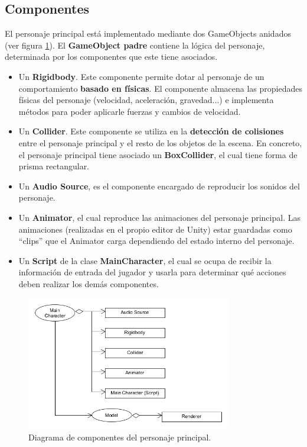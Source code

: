 \subsection{Componentes}
El personaje principal está implementado mediante dos GameObjects anidados (ver figura \ref{diagrama_personaje}). El \textbf{GameObject padre} contiene la lógica del personaje, determinada por los componentes que este tiene asociados.
\begin{itemize}
	\item Un \textbf{Rigidbody}. Este componente permite dotar al personaje de un comportamiento \textbf{basado en físicas}. El componente almacena las propiedades físicas del personaje (velocidad, aceleración, gravedad...) e implementa métodos para poder aplicarle fuerzas y cambios de velocidad.
	\item Un \textbf{Collider}. Este componente se utiliza en la \textbf{detección de colisiones} entre el personaje principal y el resto de los objetos de la escena. En concreto, el personaje principal tiene asociado un \textbf{BoxCollider}, el cual tiene forma de prisma rectangular.
	\item Un \textbf{Audio Source}, es el componente encargado de reproducir los sonidos del personaje.
	\item Un \textbf{Animator}, el cual reproduce las animaciones del personaje principal. Las animaciones (realizadas en el propio editor de Unity) estar guardadas como ``clips'' que el Animator carga dependiendo del estado interno del personaje.
	\item Un \textbf{Script} de la clase \textbf{MainCharacter}, el cual se ocupa de recibir la información de entrada del jugador y usarla para determinar qué acciones deben realizar los demás componentes.
\end{itemize}
\begin{figure}[h]
	\includegraphics[width=0.8\textwidth]{images/estructura/personaje/main_character_objects}
	\centering
	\caption{Diagrama de componentes del personaje principal.}
	\label{diagrama_personaje}
\end{figure}

